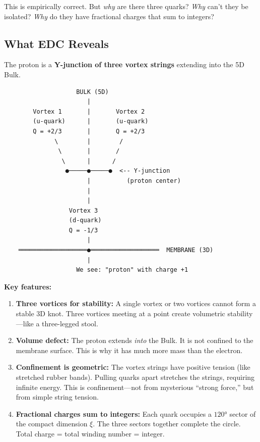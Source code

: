 This is empirically correct. But \textit{why} are there three quarks? \textit{Why} can't they be isolated? \textit{Why} do they have fractional charges that sum to integers?

\subsection{What EDC Reveals}
\label{subsec:proton_edc}

The proton is a \textbf{Y-junction of three vortex strings} extending into the 5D Bulk.

\begin{tcolorbox}[colback=blue!5,colframe=blue!70,title=\textbf{The Proton in 5D}]
\begin{verbatim}
                    BULK (5D)
                       |
        Vortex 1       |       Vortex 2
        (u-quark)      |       (u-quark)
        Q = +2/3       |       Q = +2/3
              \        |        /
               \       |       /
                \      |      /
                 ●─────●─────●  <-- Y-junction
                       |          (proton center)
                       |
                       |
                  Vortex 3
                  (d-quark)
                  Q = -1/3
                       |
    ═══════════════════●═══════════════════  MEMBRANE (3D)
                       |
                    We see: "proton" with charge +1
\end{verbatim}
\end{tcolorbox}

\textbf{Key features:}

\begin{enumerate}
    \item \textbf{Three vortices for stability:} A single vortex or two vortices cannot form a stable 3D knot. Three vortices meeting at a point create volumetric stability---like a three-legged stool.
    
    \item \textbf{Volume defect:} The proton extends \textit{into} the Bulk. It is not confined to the membrane surface. This is why it has much more mass than the electron.
    
    \item \textbf{Confinement is geometric:} The vortex strings have positive tension (like stretched rubber bands). Pulling quarks apart stretches the strings, requiring infinite energy. This is confinement---not from mysterious ``strong force,'' but from simple string tension.
    
    \item \textbf{Fractional charges sum to integers:} Each quark occupies a $120°$ sector of the compact dimension $\xi$. The three sectors together complete the circle. Total charge = total winding number = integer.
\end{enumerate}

